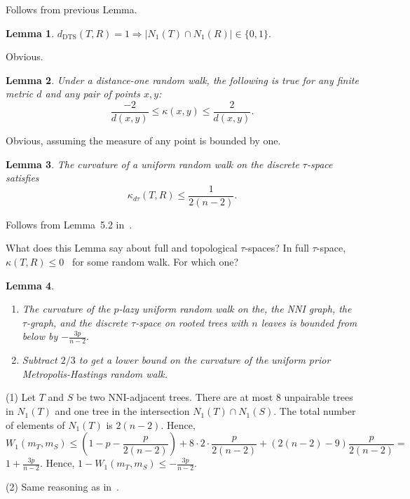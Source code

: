 \documentclass{amsart}
\newtheorem{lemma}{Lemma}
\newcommand{\dts}{\mathrm{DTS}}
\begin{document}
\proof
Follows from previous Lemma. 
\endproof

\begin{lemma}
$d_{\dts}(T,R) = 1 \Rightarrow |N_1(T)\cap N_1(R)|\in\{0,1\}.$
\end{lemma}

\proof
Obvious.
\endproof

\begin{lemma}
Under a distance-one random walk, the following is true for any finite 
metric $d$ and any pair of points $x,y$:
\[
\dfrac{-2}{d(x,y)} \leq \kappa(x,y) \leq \dfrac{2}{d(x,y)}.
\]
\end{lemma}

\proof
Obvious, assuming the measure of any point is bounded by one. 
\endproof

\begin{lemma}
The curvature of a uniform random walk on the discrete $\tau$-space satisfies 
\[
\kappa_{d\tau}(T,R) \leq 
\dfrac{1}{2(n-2)}.
\]
\end{lemma}

\proof
Follows from Lemma~5.2 in~\cite{Whidden2015-es}. 
\endproof

What does this Lemma say about full and topological $\tau$-spaces? 
In full $\tau$-space, $\kappa(T,R) \leq 0$~\cite{Gavryushkin2014-bw} for some random walk. 
For which one? 

\begin{lemma}
\begin{enumerate}
\item The curvature of the $p$-lazy uniform random walk on the, the NNI
graph, the $\tau$-graph, and the discrete $\tau$-space on rooted trees with 
$n$ leaves is bounded from below by $-\displaystyle\frac{3p}{n-2}.$
\item Subtract $2/3$ to get a lower bound on the curvature of the
uniform prior Metropolis-Hastings random walk.
\end{enumerate}
\end{lemma}

\proof
(1) Let $T$ and $S$ be two NNI-adjacent trees. There are at most $8$ unpairable 
trees in $N_1(T)$ and one tree in the intersection $N_1(T) \cap N_1(S)$. The
total number of elements of $N_1(T)$ is $2(n-2).$
Hence, 
\[
W_1(m_T,m_S)\leq (1 - p - \frac{p}{2(n - 2)}) + 
8 \cdot 2 \cdot \frac{p}{2(n - 2)} +
(2(n - 2) - 9)\frac{p}{2(n-2)} =
\]
$1 + \displaystyle\frac{3p}{n-2}.$ 
Hence, $1 - W_1(m_T,m_S) \leq - \displaystyle\frac{3p}{n-2}.$

(2) Same reasoning as in~\cite{Whidden2015-es}. 
\endproof
\end{document}
